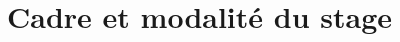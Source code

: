 \renewcommand{\partname}{}
\renewcommand{\chaptername}{}
\renewcommand{\thechapter}{}
\renewcommand{\thesection}{}

\part{Cadre et modalité du stage }


